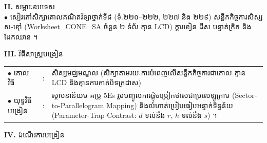 \documentclass[a4paper,10pt]{article}
\newcommand{\en}[1]{{\TimesEn #1}}
\begin{document}
{\vspace{2pt}

\textbf{II.} {\muol សម្ភារៈឧបទេស}\\[1pt]
\hspace*{0.55cm}$\bullet$ \hspace{0.35cm} សៀវភៅសិក្សាគោលគណិតវិទ្យាថ្នាក់ទី៨ (ទំ.២២០--២២២, ២២៧ និង ២២៩) សន្លឹកកិច្ចការសិស្ស ស-ខ្មៅ (\en{Worksheet\_CONE\_SA} ចំនួន ២ ទំព័រ គ្មាន \en{LCD}) ក្ដារខៀន ដីស បន្ទាត់ក្រិត និងដែកឈាន ។

\vspace{2pt}

\textbf{III.} {\muol វិធីសាស្រ្តបង្រៀន}\\[1pt]
\hspace*{0.45cm}%
\begin{tabular}{@{}l l L{14.85cm}@{}}
  $\bullet$ \hspace{0.25cm} គោលវិធី & : & សិស្សមជ្ឈមណ្ឌល (សិក្សាតាមរយៈការបំពេញលើសន្លឹកកិច្ចការជាគោល គ្មាន \en{LCD} និងគ្មានការកាត់បិទក្រដាស) \\
  $\bullet$ \hspace{0.25cm} យុទ្ធវិធីបង្រៀន & : & ស្ថាបនានិយម គម្រូ \en{5Es} រួមបញ្ចូលការផ្គុំចម្រៀកថាសជាប្រលេឡូក្រាម (\en{Sector-to-Parallelogram Mapping}) និងលំហាត់ប្រៀបធៀបអន្ទាក់ទិន្នន័យ (\en{Parameter-Trap Contrast}: $d$ ទល់នឹង $r$, $h$ ទល់នឹង $s$) ។ \\
\end{tabular}
}

\vspace{2pt}

\textbf{IV.} {\muol ដំណើរការបង្រៀន}

\vspace{1pt}
\end{document}

